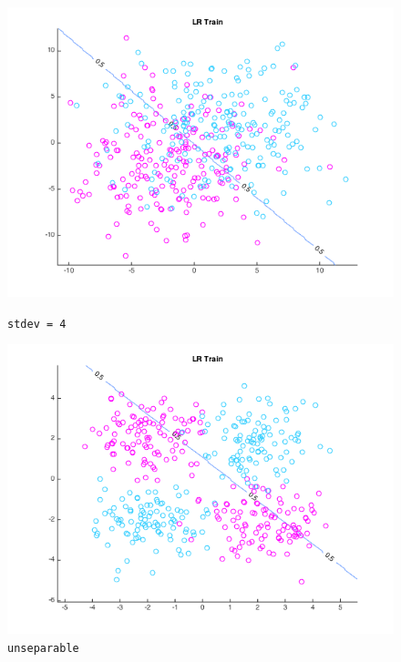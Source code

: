 \documentclass[10pt,letterpaper]{article}
\begin{document}
\begin{figure}[!htb]
  \includegraphics[width=\linewidth]{figures/sd4t0.png}
  \caption{\texttt{stdev = 4}}\label{fig:gradDifS}
\endminipage\hfill
{}
  \includegraphics[width=\linewidth]{figures/sdnt0.png}
  \caption{\texttt{unseparable}}\label{fig:gradDifS}
\endminipage
\end{figure}
\end{document}
